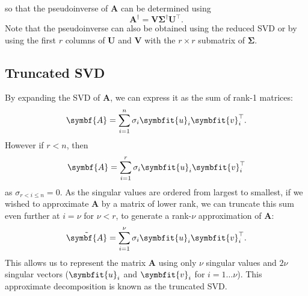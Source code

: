 \documentclass{article}
\begin{document}
so that the pseudoinverse of \(\symbf{A}\) can be determined using
\begin{equation*}
    \symbf{A}^\dagger = \symbf{V} \symbf{\Sigma}^\dagger \symbf{U}^\top.
\end{equation*}
Note that the pseudoinverse can also be obtained using the reduced SVD or by using the first \(r\) columns of \(\symbf{U}\) and \(\symbf{V}\) with the \(r \times r\) submatrix of \(\symbf{\Sigma}\).
\subsection{Truncated SVD}
By expanding the SVD of \(\symbf{A}\), we can express it as the sum of rank-1 matrices:
\begin{equation*}
    \symbf{A} = \sum_{i = 1}^n \sigma_i \symbfit{u}_i \symbfit{v}^\top_i.
\end{equation*}
However if \(r < n\), then
\begin{equation*}
    \symbf{A} = \sum_{i = 1}^r \sigma_i \symbfit{u}_i \symbfit{v}^\top_i
\end{equation*}
as \(\sigma_{r < i \leq n} = 0\). As the singular values are ordered from largest to smallest, if we wished to approximate \(\symbf{A}\)
by a matrix of lower rank, we can truncate this sum even further at \(i = \nu\) for \(\nu < r\), to generate a rank-\(\nu\) approximation of \(\symbf{A}\):
\begin{equation*}
    \tilde{\symbf{A}} = \sum_{i = 1}^\nu \sigma_i \symbfit{u}_i \symbfit{v}^\top_i.
\end{equation*}
This allows us to represent the matrix \(\symbf{A}\) using only \(\nu\) singular values and \(2\nu\) singular vectors
(\(\symbfit{u}_i\) and \(\symbfit{v}_i\) for \(i = 1 \ldots \nu\)). This approximate decomposition is known as the truncated SVD\@.
\end{document}
